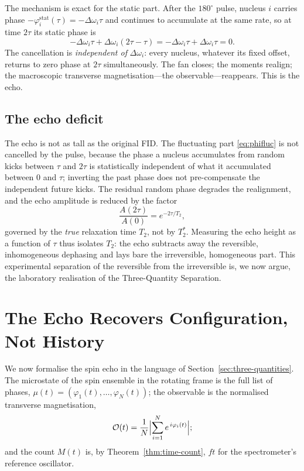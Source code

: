\documentclass[11pt,a4paper]{article}
\theoremstyle{thmstyle}
\theoremstyle{definition}
\theoremstyle{remark}
\newcommand{\Tprep}{T_{2}^{*}}
\newcommand{\Ttwo}{T_{2}}
\newcommand{\Obs}{\mathcal{O}}
\newcommand{\Mic}{\mu}
\newcommand{\Count}{M}
\begin{document}
The mechanism is exact for the static part. After the $180^{\circ}$
pulse, nucleus $i$ carries phase $-\varphi_{i}^{\mathrm{stat}}(\tau)=
-\Delta\omega_{i}\tau$ and continues to accumulate at the same rate, so at
time $2\tau$ its static phase is
\begin{equation}
-\Delta\omega_{i}\tau + \Delta\omega_{i}(2\tau-\tau)
= -\Delta\omega_{i}\tau + \Delta\omega_{i}\tau = 0 .
\label{eq:refocus}
\end{equation}
The cancellation is \emph{independent of} $\Delta\omega_{i}$: every
nucleus, whatever its fixed offset, returns to zero phase at $2\tau$
simultaneously. The fan closes; the moments realign; the macroscopic
transverse magnetisation---the observable---reappears. This is the echo.

\subsection{The echo deficit}
\label{sec:echo-deficit}

The echo is not as tall as the original FID. The fluctuating part
\eqref{eq:phifluc} is not cancelled by the pulse, because the phase a
nucleus accumulates from random kicks between $\tau$ and $2\tau$ is
statistically independent of what it accumulated between $0$ and $\tau$;
inverting the past phase does not pre-compensate the independent future
kicks. The residual random phase degrades the realignment, and the echo
amplitude is reduced by the factor
\begin{equation}
\frac{A(2\tau)}{A(0)} = e^{-2\tau/\Ttwo},
\label{eq:deficit}
\end{equation}
governed by the \emph{true} relaxation time $\Ttwo$, not by $\Tprep$.
Measuring the echo height as a function of $\tau$ thus isolates $\Ttwo$:
the echo subtracts away the reversible, inhomogeneous dephasing and lays
bare the irreversible, homogeneous part. This experimental separation of
the reversible from the irreversible is, we now argue, the laboratory
realisation of the Three-Quantity Separation.

\section{The Echo Recovers Configuration, Not History}
\label{sec:configuration}

We now formalise the spin echo in the language of
Section~\ref{sec:three-quantities}. The microstate of the spin ensemble
in the rotating frame is the full list of phases,
$\Mic(t)=(\varphi_{1}(t),\dots,\varphi_{N}(t))$; the observable is the
normalised transverse magnetisation,
\begin{equation}
\Obs(t) = \frac{1}{N}\Bigl|\sum_{i=1}^{N} e^{\,i\varphi_{i}(t)}\Bigr|;
\label{eq:obs}
\end{equation}
and the count $\Count(t)$ is, by Theorem~\ref{thm:time-count}, $ft$ for
the spectrometer's reference oscillator.
\end{document}
